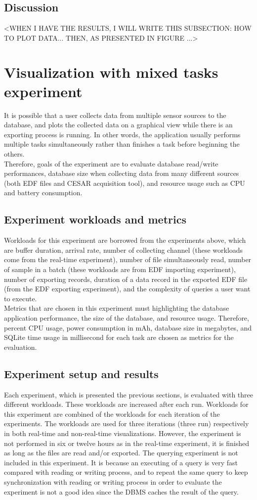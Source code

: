 \subsection{Discussion}
<WHEN I HAVE THE RESULTS, I WILL WRITE THIS SUBSECTION: HOW TO PLOT DATA... THEN, AS PRESENTED IN FIGURE ...>
\section{Visualization with mixed tasks experiment}
It is possible that a user collects data from multiple sensor sources to the database, and plots the collected data on a graphical view while there is an exporting process is running. In other words, the application usually performs multiple tasks simultaneously rather than finishes a task before beginning the others.\\
Therefore, goals of the experiment are to evaluate database read/write performances, database size when collecting data from many different sources (both EDF files and CESAR acquisition tool), and resource usage such as CPU and battery consumption.
\subsection{Experiment workloads and metrics}
Workloads for this experiment are borrowed from the experiments above, which are buffer duration, arrival rate, number of collecting channel (these workloads come from the real-time experiment), number of file simultaneously read, number of sample in a batch (these workloads are from EDF importing experiment), number of exporting records, duration of a data record in the exported EDF file (from the EDF exporting experiment), and the complexity of queries a user want to execute.\\
Metrics that are chosen in this experiment must highlighting the database application performance, the size of the database, and resource usage. Therefore, percent CPU usage, power consumption in mAh, database size in megabytes, and SQLite time usage in millisecond for each task are chosen as metrics for the evaluation.
\subsection{Experiment setup and results}
Each experiment, which is presented the previous sections, is evaluated with three different workloads. These workloads are increased after each run. Workloads for this experiment are combined of the workloads for each iteration of the experiments. The workloads are used for three iterations (three run) respectively in both real-time and non-real-time visualizations. However, the experiment is not performed in six or twelve hours as in the real-time experiment, it is finished as long as the files are read and/or exported. The querying experiment is not included in this experiment. It is because an executing of a query is very fast compared with reading or writing process, and to repeat the same query to keep synchronization with reading or writing process in order to evaluate the experiment is not a good idea since the DBMS caches the result of the query.
